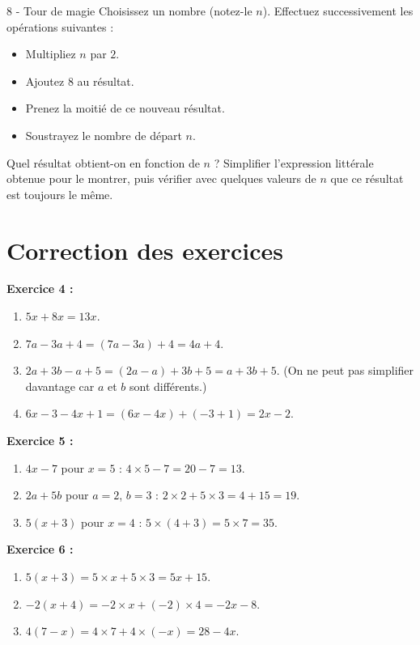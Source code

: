 \begin{exercice}{8 - Tour de magie} Choisissez un nombre (notez-le $n$). Effectuez successivement les opérations suivantes : \begin{itemize} 
\item Multipliez $n$ par $2$. 
\item Ajoutez $8$ au résultat. 
\item Prenez la moitié de ce nouveau résultat. 
\item Soustrayez le nombre de départ $n$. 
\end{itemize} 
Quel résultat obtient-on en fonction de $n$ ? Simplifier l'expression littérale obtenue pour le montrer, puis vérifier avec quelques valeurs de $n$ que ce résultat est toujours le même. \end{exercice}


\section{Correction des exercices}
\noindent \textbf{Exercice 4 :} 
\begin{enumerate}[label=\alph*)] 
\item $5x + 8x = 13x$. 
\item $7a - 3a + 4 = (7a - 3a) + 4 = 4a + 4$. 
\item $2a + 3b - a + 5 = (2a - a) + 3b + 5 = a + 3b + 5$. (On ne peut pas simplifier davantage car $a$ et $b$ sont différents.) \item $6x - 3 - 4x + 1 = (6x - 4x) + (-3 + 1) = 2x - 2$. \end{enumerate}

\medskip

\noindent \textbf{Exercice 5 :} 
\begin{enumerate}[label=\alph*)] 
\item $4x - 7$ pour $x=5$ : $4 \times 5 - 7 = 20 - 7 = 13$. 
\item $2a + 5b$ pour $a=2$, $b=3$ : $2 \times 2 + 5 \times 3 = 4 + 15 = 19$. 
\item $5(x+3)$ pour $x=4$ : $5 \times (4+3) = 5 \times 7 = 35$. \end{enumerate}

\medskip

\noindent \textbf{Exercice 6 :} 
\begin{enumerate}[label=\alph*)] 
\item $5(x+3) = 5 \times x + 5 \times 3 = 5x + 15$. 
\item $-2(x+4) = -2 \times x + (-2) \times 4 = -2x - 8$. 
\item $4(7 - x) = 4 \times 7 + 4 \times (-x) = 28 - 4x$. \end{enumerate}

